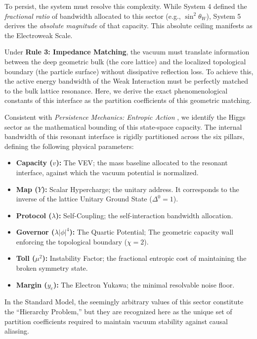 To persist, the system must resolve this complexity. While System 4 defined the \textit{fractional ratio} of bandwidth allocated to this sector (e.g., $\sin^2\theta_W$), System 5 derives the \textit{absolute magnitude} of that capacity. This absolute ceiling manifests as the Electroweak Scale.

Under \textbf{Rule 3: Impedance Matching}, the vacuum must translate information between the deep geometric bulk (the core lattice) and the localized topological boundary (the particle surface) without dissipative reflection loss. To achieve this, the active energy bandwidth of the Weak Interaction must be perfectly matched to the bulk lattice resonance. Here, we derive the exact phenomenological constants of this interface as the partition coefficients of this geometric matching.

Consistent with \textit{Persistence Mechanics: Entropic Action} \cite{meyer_ieaction_2026}, we identify the Higgs sector as the mathematical bounding of this state-space capacity. The internal bandwidth of this resonant interface is rigidly partitioned across the six pillars, defining the following physical parameters:

\begin{itemize}
    \item \textbf{Capacity ($v$):} The VEV; the mass baseline allocated to the resonant interface, against which the vacuum potential is normalized.
    \item \textbf{Map ($Y$):} Scalar Hypercharge; the unitary address. It corresponds to the inverse of the lattice Unitary Ground State ($\Delta^0=1$).
    \item \textbf{Protocol ($\lambda$):} Self-Coupling; the self-interaction bandwidth allocation.
    \item \textbf{Governor ($\lambda|\phi|^4$):} The Quartic Potential; The geometric capacity wall enforcing the topological boundary ($\chi=2$).
    \item \textbf{Toll ($\mu^2$):} Instability Factor; the fractional entropic cost of maintaining the broken symmetry state.
    \item \textbf{Margin ($y_e$):} The Electron Yukawa; the minimal resolvable noise floor.
\end{itemize}

In the Standard Model, the seemingly arbitrary values of this sector constitute the ``Hierarchy Problem,'' but they are recognized here as the unique set of partition coefficients required to maintain vacuum stability against causal aliasing.

